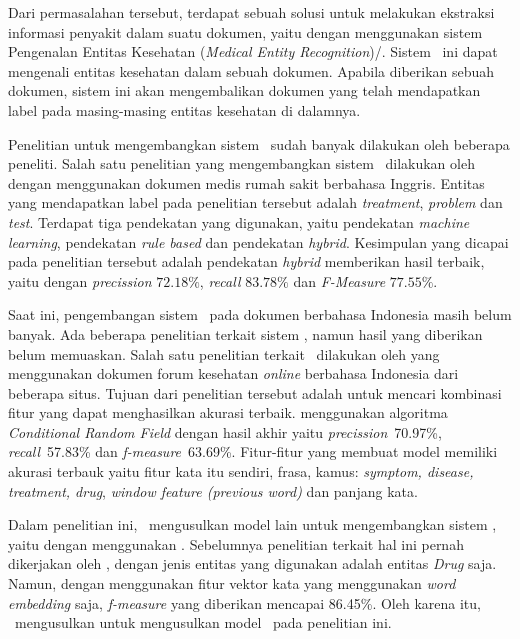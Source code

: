 	Dari permasalahan tersebut, terdapat sebuah solusi untuk melakukan ekstraksi informasi penyakit dalam suatu dokumen, yaitu dengan menggunakan sistem Pengenalan Entitas Kesehatan (\textit{Medical Entity Recognition})/. Sistem \mer~ini dapat mengenali entitas kesehatan dalam sebuah dokumen. Apabila diberikan sebuah dokumen, sistem ini akan mengembalikan dokumen yang telah mendapatkan label pada masing-masing entitas kesehatan di dalamnya.
	
	Penelitian untuk mengembangkan sistem \mer~sudah banyak dilakukan oleh beberapa peneliti. Salah satu penelitian yang mengembangkan sistem \mer~dilakukan oleh \cite{abacha2011medical} dengan menggunakan dokumen medis rumah sakit berbahasa Inggris. Entitas yang mendapatkan label pada penelitian tersebut adalah \textit{treatment}, \textit{problem} dan \textit{test}. Terdapat tiga pendekatan yang digunakan, yaitu pendekatan \textit{machine learning}, pendekatan \textit{rule based} dan pendekatan \textit{hybrid}. Kesimpulan yang dicapai pada penelitian tersebut adalah pendekatan \textit{hybrid} memberikan hasil terbaik, yaitu dengan \textit{precission} $ 72.18\% $, \textit{recall} $ 83.78\% $ dan \textit{F-Measure} $ 77.55\% $.
		
	Saat ini, pengembangan sistem \mer~pada dokumen berbahasa Indonesia masih belum banyak. Ada beberapa penelitian terkait sistem \mer, namun hasil yang diberikan belum memuaskan. Salah satu penelitian terkait \mer~dilakukan oleh \cite{skripsiKakRadit} yang menggunakan dokumen forum kesehatan \textit{online} berbahasa Indonesia dari beberapa situs. Tujuan dari penelitian tersebut adalah untuk mencari kombinasi fitur yang dapat menghasilkan akurasi terbaik. \cite{skripsiKakRadit} menggunakan algoritma \textit{Conditional Random Field} dengan hasil akhir yaitu \textit{precission}~70.97\%, \textit{recall}~57.83\% dan \textit{f-measure}~63.69\%. Fitur-fitur yang membuat model memiliki akurasi terbauk yaitu fitur kata itu sendiri, frasa, kamus: \textit{symptom, disease, treatment, drug}, \textit{window feature (previous word)} dan panjang kata.

	Dalam penelitian ini, \saya~mengusulkan model lain untuk mengembangkan sistem \mer, yaitu dengan menggunakan \rnn. Sebelumnya penelitian terkait hal ini pernah dikerjakan oleh \cite{mujiono2016new}, dengan jenis entitas yang digunakan adalah entitas \textit{Drug} saja. Namun, dengan menggunakan fitur vektor kata yang menggunakan \textit{word embedding} saja, \textit{f-measure} yang diberikan mencapai 86.45\%. Oleh karena itu, \saya~mengusulkan untuk mengusulkan model \rnn~pada penelitian ini.
		
